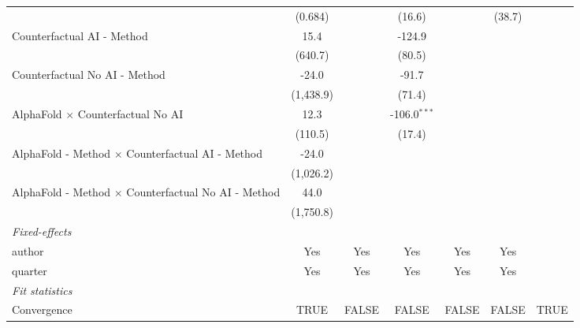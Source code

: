 \begin{tabular}{lcccccc}
                                                              & (0.684)   &               & (16.6)         &              & (38.7)       &   \\   
   Counterfactual AI - Method                                 & 15.4      &               & -124.9         &              &              &   \\   
                                                              & (640.7)   &               & (80.5)         &              &              &   \\   
   Counterfactual No AI - Method                              & -24.0     &               & -91.7          &              &              &   \\   
                                                              & (1,438.9) &               & (71.4)         &              &              &   \\   
   AlphaFold $\times$ Counterfactual No AI                    & 12.3      &               & -106.0$^{***}$ &              &              &   \\   
                                                              & (110.5)   &               & (17.4)         &              &              &   \\   
   AlphaFold - Method $\times$ Counterfactual AI - Method     & -24.0     &               &                &              &              &   \\   
                                                              & (1,026.2) &               &                &              &              &   \\   
   AlphaFold - Method $\times$ Counterfactual No AI - Method  & 44.0      &               &                &              &              &   \\   
                                                              & (1,750.8) &               &                &              &              &   \\   
   \midrule
   \emph{Fixed-effects}\\
   author                                                     & Yes       & Yes           & Yes            & Yes          & Yes          & \\  
   quarter                                                    & Yes       & Yes           & Yes            & Yes          & Yes          & \\  
   \midrule
   \emph{Fit statistics}\\
   Convergence                                                &TRUE       & FALSE         & FALSE          & FALSE        & FALSE        & TRUE\\  

\end{tabular}
